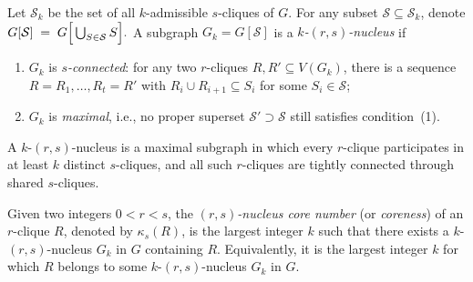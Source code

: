 \begin{definition}[$k$-$(r,s)$-nucleus]\label{def:k-rs-nucleus-new}
Let $\mathcal S_k$ be the set of all $k$-admissible $s$-cliques of $G$.
For any subset $\mathcal S\subseteq\mathcal S_k$, denote
$
   G[\mathcal S] \;=\; G\, \!\Bigl[\,
        \bigcup_{S\in\mathcal S} S
   \Bigr].
$
A subgraph $G_k = G[\mathcal S]$ is a \emph{$k$-$(r,s)$-nucleus} if
\begin{enumerate}[leftmargin=*]
  \item $G_k$ is \emph{$s$-connected}: for any two $r$-cliques
        $R,R'\subseteq V(G_k)$, there is a sequence
        $R=R_1,\dots,R_t=R'$ with
        $R_i\cup R_{i+1}\subseteq S_i$ for some
        $S_i\in\mathcal S$;
  \item $G_k$ is \emph{maximal}, i.e., no proper superset
        $\mathcal{S}' \supset \mathcal{S}$ still satisfies condition~(1).
\end{enumerate}
\end{definition}

A $k$-$(r,s)$-nucleus is a maximal subgraph in which 
every $r$-clique participates in at least $k$ distinct $s$-cliques, 
and all such $r$-cliques are tightly connected through shared $s$-cliques. 

\begin{definition}\label{def:r-clique-core-number}
Given two integers $0 < r < s$,  
the \emph{$(r,s)$-nucleus core number} (or \textit{coreness}) of an $r$-clique $R$, denoted by $\kappa_s(R)$, 
is the largest integer $k$ such that there exists a $k$-$(r,s)$-nucleus $G_k$ in $G$ containing $R$. 
Equivalently, it is the largest integer $k$ for which $R$ belongs to some $k$-$(r,s)$-nucleus $G_k$ in $G$.
\end{definition}


